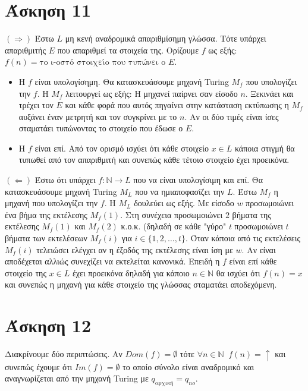 \documentclass[11pt]{article}
\begin{document}
\section*{Άσκηση 11}
$(\Rightarrow)$ Έστω $L$ μη κενή αναδρομικά απαριθμίσημη γλώσσα. Τότε υπάρχει απαριθμιτής $E$ 
που απαριθμεί τα στοιχεία της. Ορίζουμε $f$ ως εξής: $f(n) = \text{το ι-οστό στοιχείο που τυπώνει ο }E$. 
\begin{itemize}
  \item Η $f$ είναι υπολογίσημη. Θα κατασκευάσουμε μηχανή Turing $M_f$ που υπολογίζει την $f$. Η $M_f$ 
    λειτουργεί ως εξής: Η μηχανεί παίρνει σαν είσοδο $n$. Ξεκινάει και τρέχει τον $E$ και κάθε φορά 
    που αυτός πηγαίνει στην κατάσταση εκτύπωσης η $M_f$ αυξάνει έναν μετρητή και τον συγκρίνει με το $n$.
    Αν οι δύο τιμές είναι ίσες σταματάει τυπώνοντας το στοιχείο που έδωσε ο $E$. 
  \item Η $f$ είναι επί. Από τον ορισμό ισχύει ότι κάθε στοιχείο $x\in L$ κάποια στιγμή θα τυπωθεί
    από τον απαριθμιτή και συνεπώς κάθε τέτοιο στοιχείο έχει προεικόνα.
\end{itemize}

$(\Leftarrow)$ Έστω ότι υπάρχει $f:\mathbb{N}\rightarrow L$ που να είναι υπολογίσιμη και επί. Θα
κατασκευάσουμε μηχανή Turing $M_L$ που να ημιαποφασίζει την $L$. Έστω $M_f$ η μηχανή που υπολογίζει 
την $f$. H $M_L$ δουλεύει ως εξής. Με είσοδο $w$ προσωμοιώνει ένα βήμα της εκτέλεσης $M_f(1)$. Στη συνέχεια 
προσωμοιώνει $2$ βήματα της εκτέλεσης $M_f(1)$ και $M_f(2)$ κ.ο.κ. (δηλαδή σε κάθε "γύρο" $t$ προσωμοιώνει
$t$ βήματα των εκτελέσεων $M_f(i)$ για $i\in\{1,2,\ldots,t\}$. Όταν κάποια από τις εκτελέσεις $M_f(i)$ τελειώσει ελέγχει
αν η έξοδός της εκτέλεσης είναι ίση με $w$. Αν είναι αποδέχεται αλλιώς συνεχίζει να εκτελείται κανονικά.
Επειδή η $f$ είναι επί κάθε στοιχείο της $x\in L$ έχει προεικόνα δηλαδή για κάποιο $n\in \mathbb{N}$ θα ισχύει ότι
$f(n)=x$ και συνεπώς η μηχανή για κάθε στοιχείο της γλώσσας σταματάει αποδεχόμενη.




\section*{Άσκηση 12}
Διακρίνουμε δύο περιπτώσεις. Αν $Dom(f)=\emptyset$ τότε $\forall n\in \mathbb{N}\;\; f(n) = \uparrow$ και 
συνεπώς έχουμε ότι $Im(f)=\emptyset$ το οποίο σύνολο είναι αναδρομικό και αναγνωρίζεται από την 
μηχανή Turing με $q_{\text{αρχική}} = q_{no}$.
\end{document}
